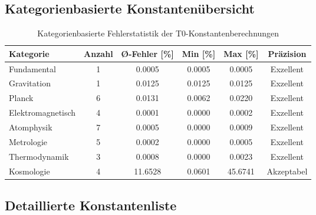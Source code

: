 \documentclass[11pt,a4paper]{article}
\begin{document}
	\subsection{Kategorienbasierte Konstantenübersicht}
	
	\begin{table}[h]
		\centering
		\begin{tabular}{>{\raggedright}p{4cm}ccccc}
			\toprule
			\textbf{Kategorie} & \textbf{Anzahl} & \textbf{Ø-Fehler [\%]} & \textbf{Min [\%]} & \textbf{Max [\%]} & \textbf{Präzision} \\
			\midrule
			Fundamental & 1 & 0.0005 & 0.0005 & 0.0005 & Exzellent \\
			Gravitation & 1 & 0.0125 & 0.0125 & 0.0125 & Exzellent \\
			Planck & 6 & 0.0131 & 0.0062 & 0.0220 & Exzellent \\
			Elektromagnetisch & 4 & 0.0001 & 0.0000 & 0.0002 & Exzellent \\
			Atomphysik & 7 & 0.0005 & 0.0000 & 0.0009 & Exzellent \\
			Metrologie & 5 & 0.0002 & 0.0000 & 0.0005 & Exzellent \\
			Thermodynamik & 3 & 0.0008 & 0.0000 & 0.0023 & Exzellent \\
			Kosmologie & 4 & 11.6528 & 0.0601 & 45.6741 & Akzeptabel \\
			\bottomrule
		\end{tabular}
		\caption{Kategorienbasierte Fehlerstatistik der T0-Konstantenberechnungen}
	\end{table}
	
	\subsection{Detaillierte Konstantenliste}
	
\end{document}
